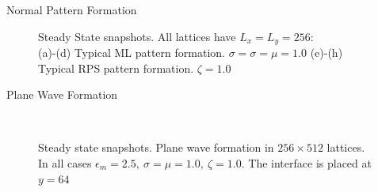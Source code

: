 \documentclass{beamer}
\begin{document}
\begin{frame}{}
\begin{textblock}{0.32}
\begin{block}{Normal Pattern Formation}
\begin{figure}[h]
            \caption{\centering Steady State snapshots. All lattices have $L_x = L_y = 256$: \\ (a)-(d) Typical ML pattern formation. $\sigma = \sigma = \mu = 1.0$  (e)-(h) Typical RPS pattern formation. $\zeta = 1.0$}
            \label{fig:patterns}
        \end{figure}
    \end{block}
    \hfill
    \begin{block}{Plane Wave Formation}
        \begin{figure}[h]
            \centering
            \\
            \caption{\centering Steady state snapshots. Plane wave formation in $256 \times 512$ lattices. In all cases $\epsilon_m = 2.5, \ \sigma = \mu = 1.0, \ \zeta = 1.0$. The interface is placed at $y = 64$}

\end{figure}
\end{block}
\end{textblock}
\end{frame}
\end{document}
